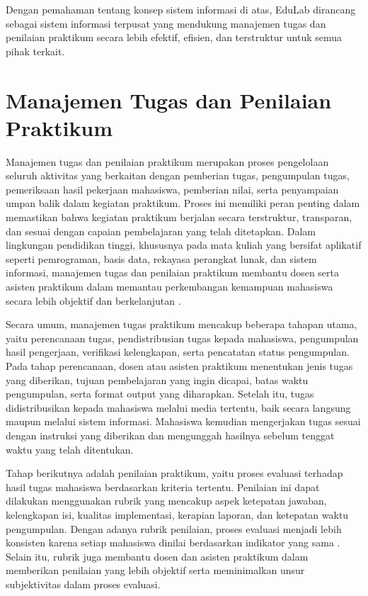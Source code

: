 \documentclass[12pt,a4paper,twoside]{report}
\begin{document}
Dengan pemahaman tentang konsep sistem informasi di atas, EduLab dirancang sebagai sistem informasi terpusat yang mendukung manajemen tugas dan penilaian praktikum secara lebih efektif, efisien, dan terstruktur untuk semua pihak terkait.

\section{Manajemen Tugas dan Penilaian Praktikum}

Manajemen tugas dan penilaian praktikum merupakan proses pengelolaan seluruh aktivitas yang berkaitan dengan pemberian tugas, pengumpulan tugas, pemeriksaan hasil pekerjaan mahasiswa, pemberian nilai, serta penyampaian umpan balik dalam kegiatan praktikum. Proses ini memiliki peran penting dalam memastikan bahwa kegiatan praktikum berjalan secara terstruktur, transparan, dan sesuai dengan capaian pembelajaran yang telah ditetapkan. Dalam lingkungan pendidikan tinggi, khususnya pada mata kuliah yang bersifat aplikatif seperti pemrograman, basis data, rekayasa perangkat lunak, dan sistem informasi, manajemen tugas dan penilaian praktikum membantu dosen serta asisten praktikum dalam memantau perkembangan kemampuan mahasiswa secara lebih objektif dan berkelanjutan \cite{ihantola2010}.

Secara umum, manajemen tugas praktikum mencakup beberapa tahapan utama, yaitu perencanaan tugas, pendistribusian tugas kepada mahasiswa, pengumpulan hasil pengerjaan, verifikasi kelengkapan, serta pencatatan status pengumpulan. Pada tahap perencanaan, dosen atau asisten praktikum menentukan jenis tugas yang diberikan, tujuan pembelajaran yang ingin dicapai, batas waktu pengumpulan, serta format output yang diharapkan. Setelah itu, tugas didistribusikan kepada mahasiswa melalui media tertentu, baik secara langsung maupun melalui sistem informasi. Mahasiswa kemudian mengerjakan tugas sesuai dengan instruksi yang diberikan dan mengunggah hasilnya sebelum tenggat waktu yang telah ditentukan.

Tahap berikutnya adalah penilaian praktikum, yaitu proses evaluasi terhadap hasil tugas mahasiswa berdasarkan kriteria tertentu. Penilaian ini dapat dilakukan menggunakan rubrik yang mencakup aspek ketepatan jawaban, kelengkapan isi, kualitas implementasi, kerapian laporan, dan ketepatan waktu pengumpulan. Dengan adanya rubrik penilaian, proses evaluasi menjadi lebih konsisten karena setiap mahasiswa dinilai berdasarkan indikator yang sama \cite{dawson2017}. Selain itu, rubrik juga membantu dosen dan asisten praktikum dalam memberikan penilaian yang lebih objektif serta meminimalkan unsur subjektivitas dalam proses evaluasi.
\end{document}
